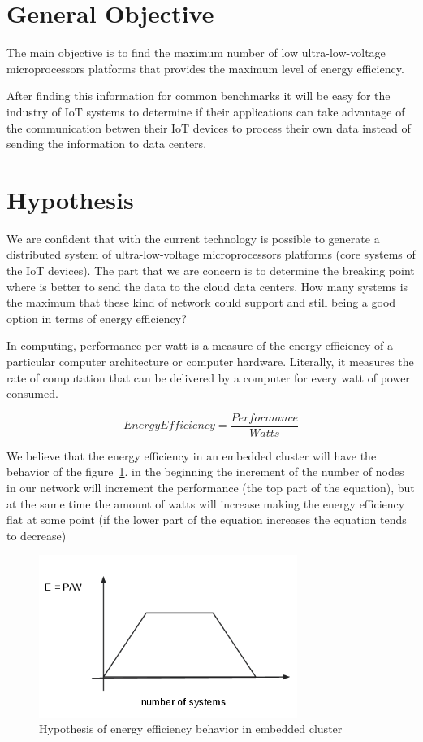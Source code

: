 \section{General Objective}
\noindent

The main objective is to find the maximum number of low ultra-low-voltage
microprocessors platforms that provides the maximum level of energy efficiency.

After finding this information for common benchmarks it will be easy for the
industry of IoT systems to determine if their applications can take advantage
of the communication betwen their IoT devices to process their own data instead
of sending the information to data centers.

\section{Hypothesis}
\noindent

We are confident that with the current technology is possible to generate a
distributed system of ultra-low-voltage microprocessors platforms (core
systems of the IoT devices). The part that we are concern is to determine the
breaking point where is better to send the data to the cloud data centers. How
many systems is the maximum that these kind of network could support and still
being a good option in terms of energy efficiency?

In computing, performance per watt is a measure of the energy efficiency of a
particular computer architecture or computer hardware. Literally, it measures
the rate of computation that can be delivered by a computer for every watt of
power consumed.\cite{Burd} 


\begin{equation}
    Energy Efficiency = \dfrac {Performance}{Watts}
\end{equation}

We believe that the energy efficiency in an embedded cluster will have the
behavior of the  figure~\ref{fig:1.2}. in the beginning the increment of the
number of nodes in our network will increment the performance (the top part of
the equation), but at the same time the amount of watts will
increase making the energy efficiency flat at some point (if the lower part of
the equation increases the equation tends to decrease)


\begin{figure}[H]
\centering
\includegraphics[width=0.75\textwidth]{images/graph_1.png}
\caption{Hypothesis of energy efficiency behavior in embedded cluster}
\label{fig:1.2}
\end{figure}

